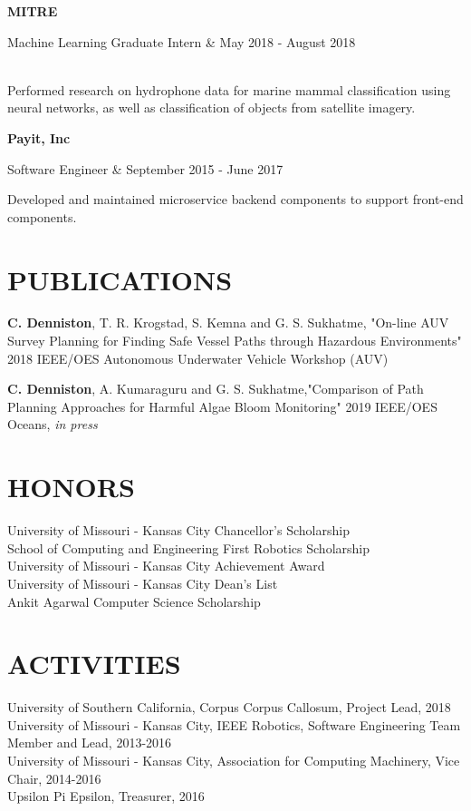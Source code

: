 \documentclass[margin,10pt]{res} %
\begin{document}
\begin{resume}
        {\bf MITRE} \\
           \begin{ncolumn}{2}
           Machine Learning Graduate Intern & May 2018 - August 2018
           \end{ncolumn} \\
           Performed research on hydrophone data for marine mammal classification using neural networks, as well as classification of objects from satellite imagery.   
           
       {\bf Payit, Inc} \\
           \begin{ncolumn}{2}
           Software Engineer & September 2015 - June 2017
           \end{ncolumn}
           Developed and maintained microservice backend components to support front-end components.
          

\section{PUBLICATIONS}
{\bf C. Denniston}, T. R. Krogstad, S. Kemna and G. S. Sukhatme, "On-line AUV Survey Planning for Finding Safe Vessel Paths through Hazardous Environments" 2018 IEEE/OES Autonomous Underwater Vehicle Workshop (AUV)

{\bf C. Denniston}, A. Kumaraguru and G. S. Sukhatme,"Comparison of Path Planning Approaches for Harmful Algae Bloom
Monitoring" 2019 IEEE/OES Oceans, {\it in press}
\section{HONORS}
University of Missouri - Kansas City Chancellor's Scholarship \\
School of Computing and Engineering First Robotics Scholarship \\
University of Missouri - Kansas City Achievement Award  \\
University of Missouri - Kansas City Dean's List \\
Ankit Agarwal Computer Science Scholarship

\section{ACTIVITIES}
University of Southern California, Corpus Corpus Callosum, Project Lead, 2018 \\
University of Missouri - Kansas City, IEEE Robotics, Software Engineering Team Member and Lead, 2013-2016 \\
University of Missouri - Kansas City, Association for Computing Machinery, Vice Chair, 2014-2016\\
Upsilon Pi Epsilon, Treasurer, 2016

\end{resume}
\end{document}
